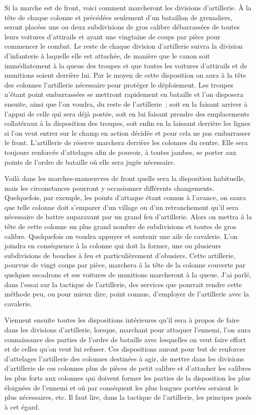 \documentclass[french,twoside]{book} %
\begin{document}
Si la marche est de front, voici comment marcheront les divisions d’artillerie. À la tête de chaque colonne et précédées seulement d’un bataillon de grenadiers, seront placées une ou deux subdivisions de gros calibre débarrassées de toutes leurs voitures d’attirails et ayant une vingtaine de coups par pièce pour commencer le combat. Le reste de chaque division d’artillerie suivra la division d’infanterie à laquelle elle est attachée, de manière que le canon soit immédiatement à la queue des troupes et que toutes les voitures d’attirails et de munitions soient derrière lui. Par le moyen de cette disposition on aura à la tête des colonnes l’artillerie nécessaire pour protéger le déploiement. Les troupes n’étant point embarrassées se mettront rapidement en bataille et l’on disposera ensuite, ainsi que l’on voudra, du reste de l’artillerie ; soit en la faisant arriver à l’appui de celle qui sera déjà postée, soit en lui faisant prendre des emplacements collatéraux à la disposition des troupes, soit enfin en la laissant derrière les lignes si l’on veut entrer sur le champ en action décidée et pour cela ne pas embarrasser le front. L’artillerie de réserve marchera derrière les colonnes du centre. Elle sera toujours renforcée d’attelages afin de pouvoir, à toutes jambes, se porter aux points de l’ordre de bataille où elle sera jugée nécessaire.\par
Voilà dans les marches-manœuvres de front quelle sera la disposition habituelle, mais les circonstances pourront y occasionner différents changements. Quelquefois, par exemple, les points d’attaque étant connus à l’avance, on saura que telle colonne doit s’emparer d’un village ou d’un retranchement qu’il sera nécessaire de battre auparavant par un grand feu d’artillerie. Alors on mettra à la tête de cette colonne un plus grand nombre de subdivisions et toutes de gros calibre. Quelquefois on voudra appuyer et soutenir une aile de cavalerie. L’on joindra en conséquence à la colonne qui doit la former, une ou plusieurs subdivisions de bouches à feu et particulièrement d’obusiers. Cette artillerie, pourvue de vingt coups par pièce, marchera à la tête de la colonne couverte par quelques escadrons et ses voitures de munitions marcheront à la queue. J’ai parlé, dans l’essai sur la tactique de l’artillerie, des services que pourrait rendre cette méthode peu, ou pour mieux dire, point connue, d’employer de l’artillerie avec la cavalerie.\par
Viennent ensuite toutes les dispositions intérieures qu’il sera à propos de faire dans les divisions d’artillerie, lorsque, marchant pour attaquer l’ennemi, l’on aura connaissance des parties de l’ordre de bataille avec lesquelles on veut faire effort et de celles qu’on veut lui refuser. Ces dispositions auront pour but de renforcer d’attelages l’artillerie des colonnes destinées à agir, de mettre dans les divisions d’artillerie de ces colonnes plus de pièces de petit calibre et d’attacher les calibres les plus forts aux colonnes qui doivent former les parties de la disposition les plus éloignées de l’ennemi et où par conséquent les plus longues portées seraient le plus nécessaires, etc. Il faut lire, dans la tactique de l’artillerie, les principes posés à cet égard.\par
\end{document}

